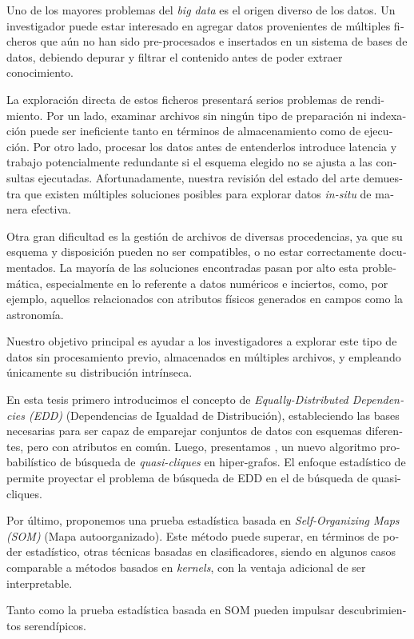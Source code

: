 \begin{otherlanguage}{spanish}
{\fontsize{11}{11}\selectfont
Uno de los mayores problemas del \textit{big data} es el origen diverso de los datos.
Un investigador puede estar interesado en agregar datos provenientes de múltiples
ficheros que aún no han sido pre-procesados e insertados en un sistema de bases de datos,
debiendo depurar y filtrar el contenido antes de poder extraer conocimiento.

La exploración directa de estos ficheros presentará serios problemas de rendimiento.
Por un lado, examinar archivos sin ningún tipo de preparación ni indexación puede ser ineficiente tanto
en términos de almacenamiento como de ejecución. Por otro lado, procesar los datos antes de entenderlos
introduce latencia y trabajo potencialmente redundante si el esquema
elegido no se ajusta a las consultas ejecutadas. Afortunadamente, nuestra revisión del estado del arte
demuestra que existen múltiples soluciones posibles para explorar datos \emph{in-situ} de manera efectiva.

Otra gran dificultad es la gestión de archivos de diversas procedencias, ya que su esquema y disposición pueden
no ser compatibles, o no estar correctamente documentados. La mayoría de las soluciones encontradas
pasan por alto esta problemática, especialmente en lo referente a datos numéricos e inciertos,
como, por ejemplo, aquellos relacionados con atributos físicos generados en campos como la astronomía.

Nuestro objetivo principal es ayudar a los investigadores a explorar este tipo de datos sin
procesamiento previo, almacenados en múltiples archivos, y empleando únicamente su distribución intrínseca.

En esta tesis primero introducimos el concepto de \textit{Equally-Distributed Dependencies (EDD)}
(Dependencias de Igualdad de Distribución), estableciendo las bases necesarias para ser capaz
de emparejar conjuntos de datos con esquemas diferentes, pero con atributos en común.
Luego, presentamos \PresQ, un nuevo algoritmo probabilístico de búsqueda de \textit{quasi-cliques} en hiper-grafos.
El enfoque estadístico de \PresQ permite proyectar el problema de búsqueda de EDD en el de búsqueda
de quasi-cliques.

Por último, proponemos una prueba estadística basada en \textit{Self-Organizing Maps (SOM)} (Mapa autoorganizado).
Este método puede superar, en términos de poder estadístico, otras técnicas
basadas en clasificadores, siendo en algunos casos comparable a métodos basados en \textit{kernels},
con la ventaja adicional de ser interpretable.

Tanto \PresQ como la prueba estadística basada en SOM pueden impulsar descubrimientos serendípicos.
}
\end{otherlanguage}

